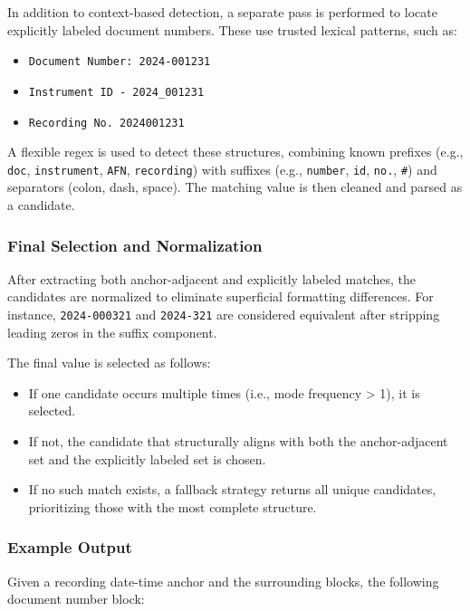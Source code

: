 \documentclass{article}
\begin{document}
In addition to context-based detection, a separate pass is performed to locate explicitly labeled document numbers. These use trusted lexical patterns, such as:

\begin{itemize}
    \item \texttt{Document Number: 2024-001231}
    \item \texttt{Instrument ID - 2024\_001231}
    \item \texttt{Recording No. 2024001231}
\end{itemize}

A flexible regex is used to detect these structures, combining known prefixes (e.g., \texttt{doc}, \texttt{instrument}, \texttt{AFN}, \texttt{recording}) with suffixes (e.g., \texttt{number}, \texttt{id}, \texttt{no.}, \texttt{\#}) and separators (colon, dash, space). The matching value is then cleaned and parsed as a candidate.

\subsubsection{Final Selection and Normalization}

After extracting both anchor-adjacent and explicitly labeled matches, the candidates are normalized to eliminate superficial formatting differences. For instance, \texttt{2024-000321} and \texttt{2024-321} are considered equivalent after stripping leading zeros in the suffix component.

The final value is selected as follows:

\begin{itemize}
    \item If one candidate occurs multiple times (i.e., mode frequency > 1), it is selected.
    \item If not, the candidate that structurally aligns with both the anchor-adjacent set and the explicitly labeled set is chosen.
    \item If no such match exists, a fallback strategy returns all unique candidates, prioritizing those with the most complete structure.
\end{itemize}

\subsubsection{Example Output}

Given a recording date-time anchor and the surrounding blocks, the following document number block:
\end{document}
